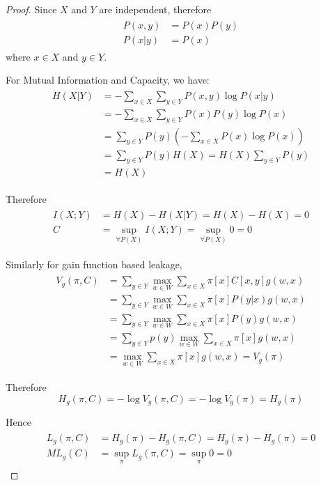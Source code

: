 \begin{proof}
	Since $X$ and $Y$ are independent, therefore
	\begin{eqnarray*}
		\begin{aligned}
			P(x,y) &= P(x)P(y) \\
			P(x|y) &= P(x)
		\end{aligned}
	\end{eqnarray*}
	where $x \in X$ and $y \in Y$.

	For Mutual Information and Capacity, we have:
	\begin{eqnarray*}
		\begin{aligned}
			H(X|Y) 
			&= - \sum_{x \in X} \sum_{y \in Y} P(x,y)\log{P(x|y)} \\
			&= - \sum_{x \in X} \sum_{y \in Y} P(x)P(y)\log{P(x)} \\
			&= \sum_{y \in Y} P(y) (- \sum_{x \in X}P(x)\log{P(x)}) \\
			&= \sum_{y \in Y} P(y) H(X) = H(X) \sum_{y \in Y}{P(y)} \\
			&= H(X)
		\end{aligned}
	\end{eqnarray*}
	
	Therefore
	\begin{eqnarray*}
		\begin{aligned}
			I(X;Y) &= H(X) - H(X|Y) = H(X) - H(X) = 0 \\
			C &= \sup_{\forall P(X)} I(X;Y) = \sup_{\forall P(X)} 0 = 0
		\end{aligned}
	\end{eqnarray*}
	
	Similarly for gain function based leakage\cite{GLeakage},
	\begin{eqnarray*}
		\begin{aligned}
			V_{g}(\pi, C) 
			&= \sum_{y \in Y}{\max_{w \in W}\sum_{x \in X}{\pi[x]C[x,y]g(w,x)}} \\
			&= \sum_{y \in Y}{\max_{w \in W}\sum_{x \in X}{\pi[x]P(y|x)g(w,x)}} \\
			&= \sum_{y \in Y}{\max_{w \in W}\sum_{x \in X}{\pi[x]P(y)g(w,x)}} \\
			&= \sum_{y \in Y}p(y){\max_{w \in W}\sum_{x \in X}{\pi[x]g(w,x)}} \\
			&= \max_{w \in W}\sum_{x \in X}{\pi[x]g(w,x)} = V_{g}(\pi)
		\end{aligned}
	\end{eqnarray*}
	
	Therefore
	\begin{equation*}
		H_g(\pi, C) = -\log{V_g(\pi, C)} = -\log{V_g(\pi)} = H_g(\pi)
	\end{equation*}
	
	Hence 
	\begin{eqnarray*}
		\begin{aligned}
			L_g(\pi, C) &= H_g(\pi) - H_g(\pi,C) = H_g(\pi) - H_g(\pi) = 0\\
			ML_g(C) &= \sup_{\pi} L_g(\pi, C) = \sup_{\pi} 0 = 0
		\end{aligned}
	\end{eqnarray*}
\end{proof}

